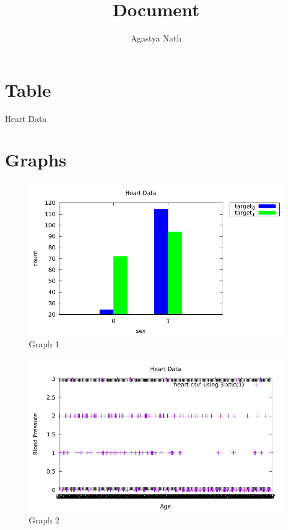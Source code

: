 \documentclass{article}
\title{Document}
\author{Agastya Nath}
\begin{document}
\maketitle
\section{Table}
\begin{table}[h!]
\centering
\caption{Heart Data}
\end{table}
\section{Graphs}
\begin{figure}[h]
\includegraphics[width=\textwidth]{./graph_q4_a.pdf}
\caption{\label{graph_1} Graph 1}
\end{figure}
\begin{figure}[h]
\includegraphics[width=\textwidth]{./graph_q4_b.pdf}
\caption{\label{graph_2} Graph 2}
\end{figure}
\end{document}
